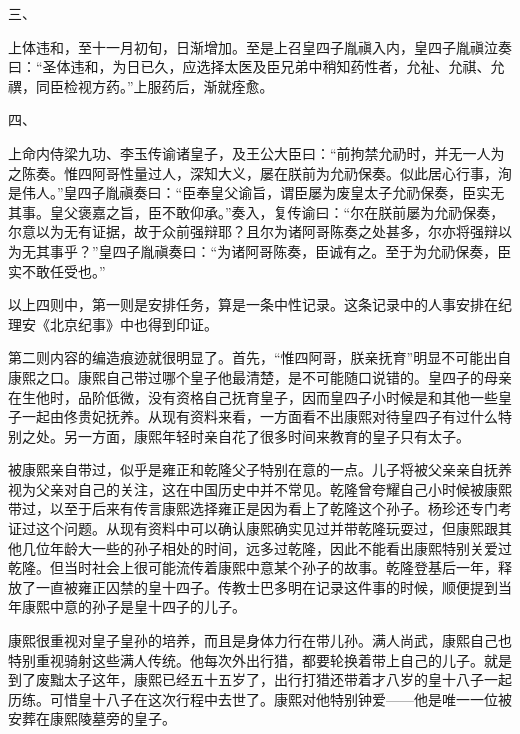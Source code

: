 
\begin{bookquote}三、\par
上体违和，至十一月初旬，日渐增加。至是上召皇四子胤禛入内，皇四子胤禛泣奏曰：“圣体违和，为日已久，应选择太医及臣兄弟中稍知药性者，允祉、允祺、允禩，同臣检视方药。”上服药后，渐就痊愈。\end{bookquote}


\begin{bookquote}四、\par
上命内侍梁九功、李玉传谕诸皇子，及王公大臣曰：“前拘禁允礽时，并无一人为之陈奏。惟四阿哥性量过人，深知大义，屡在朕前为允礽保奏。似此居心行事，洵是伟人。”皇四子胤禛奏曰：“臣奉皇父谕旨，谓臣屡为废皇太子允礽保奏，臣实无其事。皇父褒嘉之旨，臣不敢仰承。”奏入，复传谕曰：“尔在朕前屡为允礽保奏，尔意以为无有证据，故于众前强辩耶？且尔为诸阿哥陈奏之处甚多，尔亦将强辩以为无其事乎？”皇四子胤禛奏曰：“为诸阿哥陈奏，臣诚有之。至于为允礽保奏，臣实不敢任受也。”\end{bookquote}


以上四则中，第一则是安排任务，算是一条中性记录。这条记录中的人事安排在纪理安《北京纪事》中也得到印证。



第二则内容的编造痕迹就很明显了。首先，“惟四阿哥，朕亲抚育”明显不可能出自康熙之口。康熙自己带过哪个皇子他最清楚，是不可能随口说错的。皇四子的母亲在生他时，品阶低微，没有资格自己抚育皇子，因而皇四子小时候是和其他一些皇子一起由佟贵妃抚养。从现有资料来看，一方面看不出康熙对待皇四子有过什么特别之处。另一方面，康熙年轻时亲自花了很多时间来教育的皇子只有太子。



被康熙亲自带过，似乎是雍正和乾隆父子特别在意的一点。儿子将被父亲亲自抚养视为父亲对自己的关注，这在中国历史中并不常见。乾隆曾夸耀自己小时候被康熙带过，以至于后来有传言康熙选择雍正是因为看上了乾隆这个孙子。杨珍还专门考证过这个问题。从现有资料中可以确认康熙确实见过并带乾隆玩耍过，但康熙跟其他几位年龄大一些的孙子相处的时间，远多过乾隆，因此不能看出康熙特别关爱过乾隆。但当时社会上很可能流传着康熙中意某个孙子的故事。乾隆登基后一年，释放了一直被雍正囚禁的皇十四子。传教士巴多明在记录这件事的时候，顺便提到当年康熙中意的孙子是皇十四子的儿子。



康熙很重视对皇子皇孙的培养，而且是身体力行在带儿孙。满人尚武，康熙自己也特别重视骑射这些满人传统。他每次外出行猎，都要轮换着带上自己的儿子。就是到了废黜太子这年，康熙已经五十五岁了，出行打猎还带着才八岁的皇十八子一起历练。可惜皇十八子在这次行程中去世了。康熙对他特别钟爱——他是唯一一位被安葬在康熙陵墓旁的皇子。


